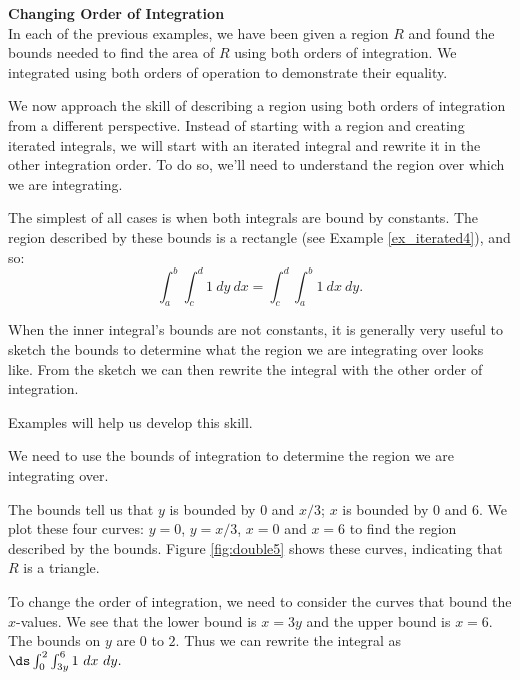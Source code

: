 \noindent \textbf{\large Changing Order of Integration}\\

In each of the previous examples, we have been given a region $R$ and found the bounds needed to find the area of $R$ using both orders of integration. We integrated using both orders of operation to demonstrate their equality.

We now approach the skill of describing a region using both orders of integration from a different perspective. Instead of starting with a region and creating iterated integrals, we will start with an iterated integral and rewrite it in the other integration order. To do so, we'll need to understand the region over which we are integrating.

The simplest of all cases is when both integrals are bound by constants. The region described by these bounds is a rectangle (see Example \ref{ex_iterated4}), and so:
$$\int_a^b\int_c^d 1\ dy\ dx = \int_c^d\int_a^b1\ dx\ dy.$$

When the inner integral's bounds are not constants, it is generally very useful to sketch the bounds to determine what the region we are integrating over looks like. From the sketch we can then rewrite the integral with the other order of integration.

Examples will help us develop this skill.\\

{We need to use the bounds of integration to determine the region we are integrating over. %

The bounds tell us that $y$ is bounded by $0$ and $x/3$; $x$ is bounded by 0 and 6. We plot these four curves: $y=0$, $y=x/3$, $x=0$ and $x=6$ to find the region described by the bounds. Figure \ref{fig:double5} shows these curves, indicating that $R$ is a triangle.
\enlargethispage{\baselineskip}

To change the order of integration, we need to consider the curves that bound the $x$-values. We see that the lower bound is $x=3y$ and the upper bound is $x=6$. The bounds on $y$ are $0$ to $2$. Thus we can rewrite the integral as 
$\ds \int_0^2\int_{3y}^6 1\ dx \ dy.$
\vskip 0pt
}\\

